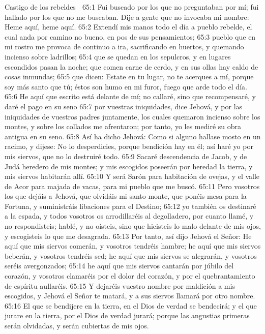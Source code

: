 Castigo de los rebeldes  

65:1 Fui buscado por los que no preguntaban por mí; fui hallado por los que no me buscaban. Dije a gente que no invocaba mi nombre: Heme aquí, heme aquí.  
65:2 Extendí mis manos todo el día a pueblo rebelde, el cual anda por camino no bueno, en pos de sus pensamientos;  
65:3 pueblo que en mi rostro me provoca de continuo a ira, sacrificando en huertos, y quemando incienso sobre ladrillos;  
65:4 que se quedan en los sepulcros, y en lugares escondidos pasan la noche; que comen carne de cerdo, y en sus ollas hay caldo de cosas inmundas;  
65:5 que dicen: Estate en tu lugar, no te acerques a mí, porque soy más santo que tú; éstos son humo en mi furor, fuego que arde todo el día.  
65:6 He aquí que escrito está delante de mí; no callaré, sino que recompensaré, y daré el pago en su seno  
65:7 por vuestras iniquidades, dice Jehová, y por las iniquidades de vuestros padres juntamente, los cuales quemaron incienso sobre los montes, y sobre los collados me afrentaron; por tanto, yo les mediré su obra antigua en su seno.  
65:8 Así ha dicho Jehová: Como si alguno hallase mosto en un racimo, y dijese: No lo desperdicies, porque bendición hay en él; así haré yo por mis siervos, que no lo destruiré todo.  
65:9 Sacaré descendencia de Jacob, y de Judá heredero de mis montes; y mis escogidos poseerán por heredad la tierra, y mis siervos habitarán allí.  
65:10 Y será Sarón para habitación de ovejas, y el valle de Acor para majada de vacas, para mi pueblo que me buscó.  
65:11 Pero vosotros los que dejáis a Jehová, que olvidáis mi santo monte, que ponéis mesa para la Fortuna, y suministráis libaciones para el Destino;  
65:12 yo también os destinaré a la espada, y todos vosotros os arrodillaréis al degolladero, por cuanto llamé, y no respondisteis; hablé, y no oísteis, sino que hicisteis lo malo delante de mis ojos, y escogisteis lo que me desagrada.  
65:13 Por tanto, así dijo Jehová el Señor: He aquí que mis siervos comerán, y vosotros tendréis hambre; he aquí que mis siervos beberán, y vosotros tendréis sed; he aquí que mis siervos se alegrarán, y vosotros seréis avergonzados;  
65:14 he aquí que mis siervos cantarán por júbilo del corazón, y vosotros clamaréis por el dolor del corazón, y por el quebrantamiento de espíritu aullaréis.  
65:15 Y dejaréis vuestro nombre por maldición a mis escogidos, y Jehová el Señor te matará, y a sus siervos llamará por otro nombre.  
65:16 El que se bendijere en la tierra, en el Dios de verdad se bendecirá; y el que jurare en la tierra, por el Dios de verdad jurará; porque las angustias primeras serán olvidadas, y serán cubiertas de mis ojos.  
